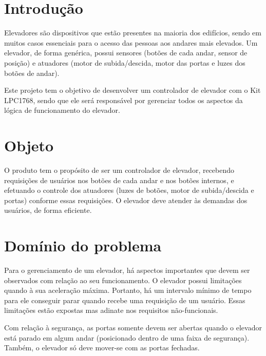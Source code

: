 
\section{Introdução}
Elevadores são dispositivos que estão presentes na maioria dos edifícios, sendo em muitos casos essenciais para o acesso das pessoas aos andares mais elevados. Um elevador, de forma genérica, possui sensores (botões de cada andar, sensor de posição) e atuadores (motor de subida/descida, motor das portas e luzes dos botões de andar).

Este projeto tem o objetivo de desenvolver um controlador de elevador com o Kit LPC1768, sendo que ele será responsável por gerenciar todos os aspectos da lógica de funcionamento do elevador.

\section{Objeto}
O produto tem o propósito de ser um controlador de elevador, recebendo requisições de usuários nos botões de cada andar e nos botões internos, e efetuando o controle dos atuadores (luzes de botões, motor de subida/descida e portas) conforme essas requisições. O elevador deve atender às demandas dos usuários, de forma eficiente.

\section{Domínio do problema}
Para o gerenciamento de um elevador, há aspectos importantes que devem ser observados com relação ao seu funcionamento.  O elevador possui limitações quando à sua aceleração máxima. Portanto, há um intervalo mínimo de tempo para ele conseguir parar quando recebe uma requisição de um usuário. Essas limitações estão expostas mas adinate nos requisitos não-funcionais.

Com relação à segurança, as portas somente devem ser abertas quando o elevador está parado em algum andar (posicionado dentro de uma faixa de segurança). Também, o elevador só deve mover-se com as portas fechadas.



